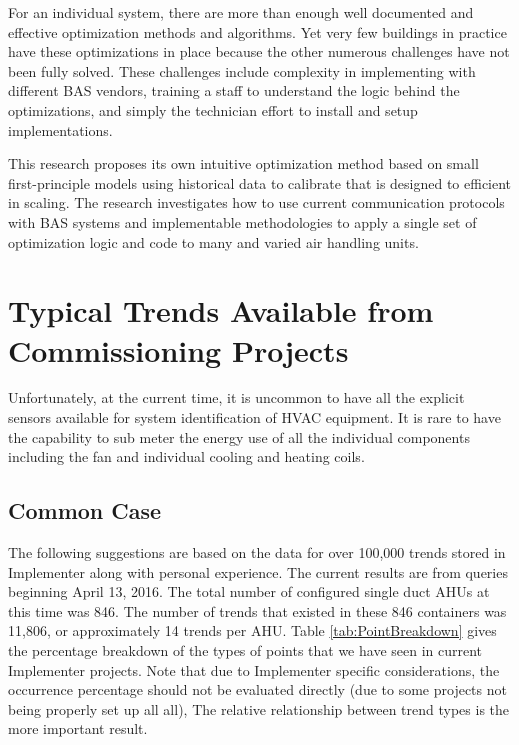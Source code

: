 For an individual system, there are more than enough well documented and effective optimization methods and algorithms. Yet very few buildings in practice have these optimizations in place because the other numerous challenges have not been fully solved. These challenges include complexity in implementing with different BAS vendors, training a staff to understand the logic behind the optimizations, and simply the technician effort to install and setup implementations.

This research proposes its own intuitive optimization method based on small first-principle models using historical data to calibrate that is designed to efficient in scaling. The research investigates how to use current communication protocols with BAS systems and implementable methodologies to apply a single set of optimization logic and code to many and varied air handling units. 

\section{Typical Trends Available from Commissioning Projects}

Unfortunately, at the current time, it is uncommon to have all the explicit sensors available for system identification of HVAC equipment. It is rare to have the capability to sub meter the energy use of all the individual components including the fan and individual cooling and heating coils. 

\subsection{Common Case}

The following suggestions are based on the data for over 100,000 trends stored in Implementer along with personal experience. The current results are from queries beginning April 13, 2016. The total number of configured single duct AHUs at this time was 846. The number of trends that existed in these 846 containers was 11,806, or approximately 14 trends per AHU. Table \ref{tab:PointBreakdown} gives the percentage breakdown of the types of points that we have seen in current Implementer projects. Note that due to Implementer specific considerations, the occurrence percentage should not be evaluated directly (due to some projects not being properly set up all all), The relative relationship between trend types is the more important result.  


